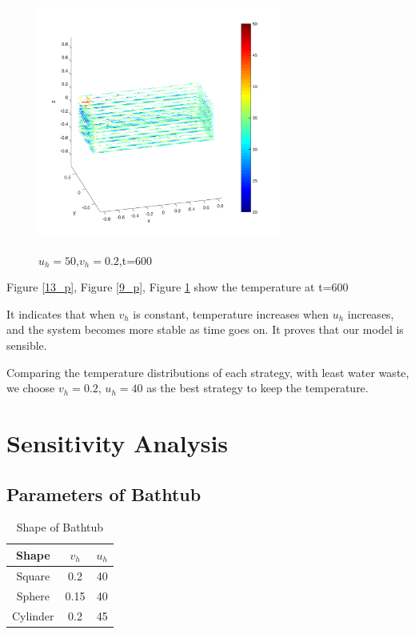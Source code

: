 \documentclass[12pt,a4paper,titlepage]{article}
\begin{document}
\begin{figure}[htb]
  \centering
  \includegraphics[width=8cm]{4-5.pdf}\\
  \caption{$u_h=50$,$v_h=0.2$,t=600}\label{14_p}
\end{figure}


Figure \ref{13_p}, Figure \ref{9_p}, Figure \ref{14_p} show the temperature at t=600







It indicates that when $v_h$ is constant, temperature increases when $u_h$ increases, and the system becomes more stable as time goes on. It proves that our model is sensible.

Comparing the temperature distributions of each strategy, with least water waste, we choose $v_h=0.2$, $u_h=40$ as the best strategy to keep the temperature.


\section{Sensitivity Analysis}
\label{sec:sensitivity-analysis}

\subsection{Parameters of Bathtub}
\label{sec:parameters of bathtub}

\begin{table}
\begin{center}
\begin{tabular}{c|c|c}
\hline
 Shape     &$v_h$  &$u_h$        \\ \hline
 Square    &0.2             & 40              \\ \hline
 Sphere    &0.15            & 40              \\ \hline
 Cylinder  &0.2             & 45              \\ \hline
\end{tabular}
\end{center}
\caption{Shape of Bathtub}\label{4_t}
\end{table}
\end{document}
